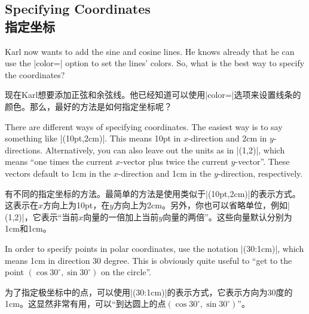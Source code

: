 

\subsection{Specifying Coordinates\\指定坐标}

Karl now wants to add the sine and cosine lines. He knows already that he can
use the |color=| option to set the lines' colors. So, what is the best way to
specify the coordinates?

现在Karl想要添加正弦和余弦线。他已经知道可以使用|color=|选项来设置线条的颜色。那么，最好的方法是如何指定坐标呢？



There are different ways of specifying coordinates. The easiest way is to say
something like |(10pt,2cm)|. This means 10pt in $x$-direction and 2cm in
$y$-directions. Alternatively, you can also leave out the units as in |(1,2)|,
which means ``one times the current $x$-vector plus twice the current
$y$-vector''. These vectors default to 1cm in the $x$-direction and 1cm in the
$y$-direction, respectively.

有不同的指定坐标的方法。最简单的方法是使用类似于|(10pt,2cm)|的表示方式。这表示在$x$方向上为10pt，在$y$方向上为2cm。另外，你也可以省略单位，例如|(1,2)|，它表示``当前$x$向量的一倍加上当前$y$向量的两倍''。这些向量默认分别为1cm和1cm。

In order to specify points in polar coordinates, use the notation |(30:1cm)|,
which means 1cm in direction 30 degree. This is obviously quite useful to ``get
to the point $(\cos 30^\circ,\sin 30^\circ)$ on the circle''.

为了指定极坐标中的点，可以使用|(30:1cm)|的表示方式，它表示方向为30度的1cm。这显然非常有用，可以``到达圆上的点$(\cos 30^\circ,\sin 30^\circ)$''。











